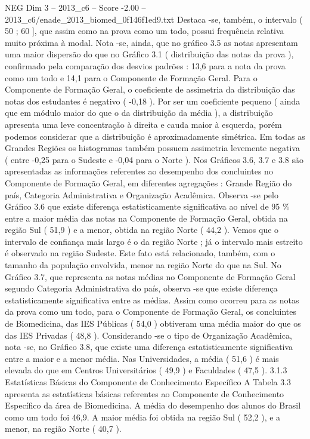 \begin{textsample}{NEG Dim 3 – 2013\_c6 – Score -2.00 – 2013\_c6/enade\_2013\_biomed\_0f146f1ed9.txt}
Destaca -se, também, o intervalo ( 50 ; 60 ], que assim como na prova como um todo, possui frequência relativa muito próxima à modal.
Nota -se, ainda, que no gráfico 3.5 as notas apresentam uma maior dispersão do que no Gráfico 3.1 ( distribuição das notas da prova ), confirmado pela comparação dos desvios padrões : 13,6 para a nota da prova como um todo e 14,1 para o Componente de Formação Geral.
Para o Componente de Formação Geral, o coeficiente de assimetria da distribuição das notas dos estudantes é negativo ( -0,18 ).
Por ser um coeficiente pequeno ( ainda que em módulo maior do que o da distribuição da média ), a distribuição apresenta uma leve concentração à direita e cauda maior à esquerda, porém podemos considerar que a distribuição é aproximadamente simétrica.
Em todas as Grandes Regiões os histogramas também possuem assimetria levemente negativa ( entre -0,25 para o Sudeste e -0,04 para o Norte ).
Nos Gráficos 3.6, 3.7 e 3.8 são apresentadas as informações referentes ao desempenho dos concluintes no Componente de Formação Geral, em diferentes agregações : Grande Região do país, Categoria Administrativa e Organização Acadêmica.
Observa -se pelo Gráfico 3.6 que existe diferença estatisticamente significativa ao nível de 95 \% entre a maior média das notas na Componente de Formação Geral, obtida na região Sul ( 51,9 ) e a menor, obtida na região Norte ( 44,2 ).
Vemos que o intervalo de confiança mais largo é o da região Norte ; já o intervalo mais estreito é observado na região Sudeste.
Este fato está relacionado, também, com o tamanho da população envolvida, menor na região Norte do que na Sul.
No Gráfico 3.7, que representa as notas médias no Componente de Formação Geral segundo Categoria Administrativa do país, observa -se que existe diferença estatisticamente significativa entre as médias.
Assim como ocorreu para as notas da prova como um todo, para o Componente de Formação Geral, os concluintes de Biomedicina, das IES Públicas ( 54,0 ) obtiveram uma média maior do que os das IES Privadas ( 48,8 ).
Considerando -se o tipo de Organização Acadêmica, nota -se, no Gráfico 3.8, que existe uma diferença estatisticamente significativa entre a maior e a menor média.
Nas Universidades, a média ( 51,6 ) é mais elevada do que em Centros Universitários ( 49,9 ) e Faculdades ( 47,5 ). 3.1.3 Estatísticas Básicas do Componente de Conhecimento Específico A Tabela 3.3 apresenta as estatísticas básicas referentes ao Componente de Conhecimento Específico da área de Biomedicina.
A média do desempenho dos alunos do Brasil como um todo foi 46,9.
A maior média foi obtida na região Sul ( 52,2 ), e a menor, na região Norte ( 40,7 ).

\end{textsample}
